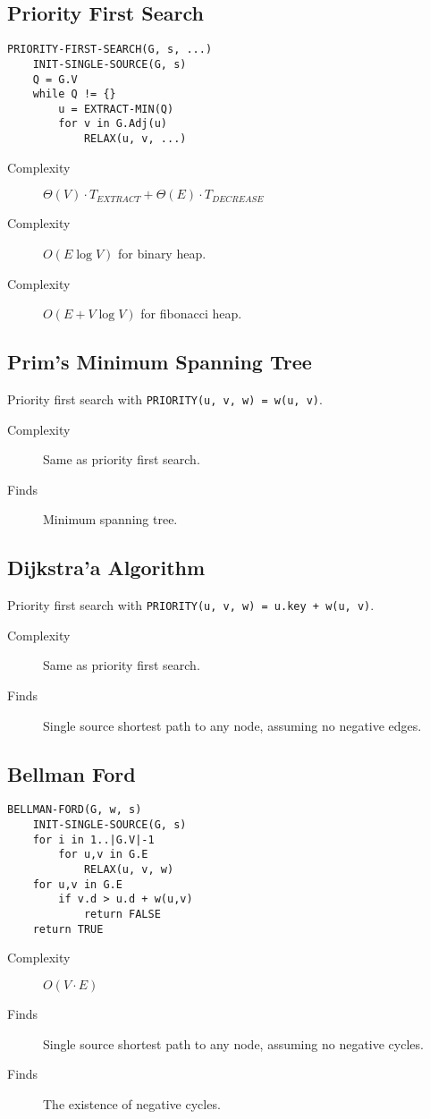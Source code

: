 \documentclass[landscape]{cheat}
\begin{document}
\begin{multicols*}{3}
\subsection{Priority First Search}
\begin{lstlisting}
PRIORITY-FIRST-SEARCH(G, s, ...)
    INIT-SINGLE-SOURCE(G, s)
    Q = G.V
    while Q != {}
        u = EXTRACT-MIN(Q)
        for v in G.Adj(u)
            RELAX(u, v, ...)
\end{lstlisting}
\begin{description}
    \item[Complexity] $\Theta(V)\cdot T_{EXTRACT} + \Theta(E)\cdot T_{DECREASE}$
    \item[Complexity] $O(E\log{V})$ for binary heap.
    \item[Complexity] $O(E+V\log{V})$ for fibonacci heap.
\end{description}

\subsection{Prim's Minimum Spanning Tree}
Priority first search with \lstinline{PRIORITY(u, v, w) = w(u, v)}.
\begin{description}
    \item[Complexity] Same as priority first search.
    \item[Finds] Minimum spanning tree.
\end{description}

\subsection{Dijkstra'a Algorithm}
Priority first search with \lstinline{PRIORITY(u, v, w) = u.key + w(u, v)}.
\begin{description}
    \item[Complexity] Same as priority first search.
    \item[Finds] Single source shortest path to any node, assuming no negative edges.
\end{description}

\subsection{Bellman Ford}
\begin{lstlisting}
BELLMAN-FORD(G, w, s)
    INIT-SINGLE-SOURCE(G, s)
    for i in 1..|G.V|-1
        for u,v in G.E
            RELAX(u, v, w)
    for u,v in G.E
        if v.d > u.d + w(u,v)
            return FALSE
    return TRUE
\end{lstlisting}
\begin{description}
    \item[Complexity] $O(V\cdot E)$
    \item[Finds] Single source shortest path to any node, assuming no negative cycles.
    \item[Finds] The existence of negative cycles.
\end{description}


\end{multicols*}
\end{document}
